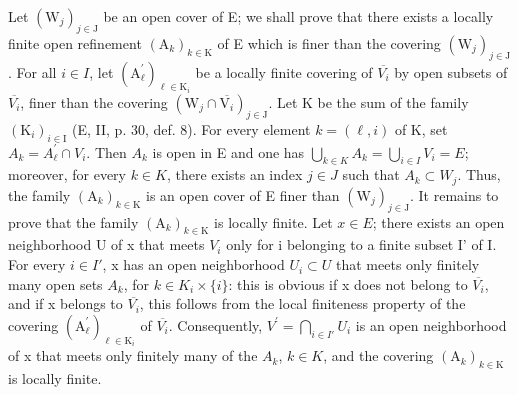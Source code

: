 Let \((\mathrm{W}_{j})_{j\in\mathrm{J}}\) be an open cover of E; we shall prove that there exists a locally finite open refinement \((\mathrm{A}_{k})_{k\in\mathrm{K}}\) of E which is finer than the covering \((\mathrm{W}_{j})_{j\in\mathrm{J}}\). For all \(i\in I\), let \((\mathrm{A}_{\ell}^{\prime})_{\ell\in\mathrm{K}_{i}}\) be a locally finite covering of \(\overline{V_{i}}\) by open subsets of \(\overline{V_{i}}\), finer than the covering \((\mathrm{W}_{j}\cap\overline{\mathrm{V}_{i}})_{j\in\mathrm{J}}\). Let K be the sum of the family \((\mathrm{K}_{i})_{i\in\mathrm{I}}\) (E, II, p. 30, def. 8). For every element \(k=(\ell,i)\) of K, set \(A_{k}=A_{\ell}^{\prime}\cap V_{i}\). Then \(A_{k}\) is open in E and one has \(\bigcup_{k\in K}A_{k}=\bigcup_{i\in I}V_{i}=E\); moreover, for every \(k\in K\), there exists an index \(j\in J\) such that \(A_{k}\subset W_{j}\). Thus, the family \((\mathrm{A}_{k})_{k\in\mathrm{K}}\) is an open cover of E finer than \((\mathrm{W}_{j})_{j\in\mathrm{J}}\). It remains to prove that the family \((\mathrm{A}_{k})_{k\in\mathrm{K}}\) is locally finite. Let \(x\in E\); there exists an open neighborhood U of x that meets \(V_{i}\) only for i belonging to a finite subset I' of I. For every \(i\in I'\), x has an open neighborhood \(U_{i}\subset U\) that meets only finitely many open sets \(A_{k}\), for \(k\in K_{i}\times\{i\}\): this is obvious if x does not belong to \(\overline{V_{i}}\), and if x belongs to \(\overline{V_{i}}\), this follows from the local finiteness property of the covering \((\mathrm{A}_{\ell}^{\prime})_{\ell\in\mathrm{K}_{i}}\) of \(\overline{V_{i}}\). Consequently, \(V^{\prime}=\bigcap_{i\in I'}U_{i}\) is an open neighborhood of x that meets only finitely many of the \(A_{k}\), \(k\in K\), and the covering \((\mathrm{A}_{k})_{k\in\mathrm{K}}\) is locally finite.


